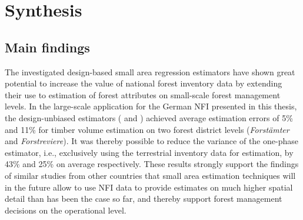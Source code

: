 	
\chapter{Synthesis}
\label{chap:synth}
\newpage



\section{Main findings}
\label{sec:synth:mainfind}


The investigated design-based small area regression estimators have shown great potential to increase the value of national forest inventory data by extending their use to estimation of forest attributes on small-scale forest management levels. In the large-scale application for the German NFI presented in this thesis, the design-unbiased estimators (\psmall{} and \extpsynth{}) achieved average estimation errors of 5\% and 11\% for timber volume estimation on two forest district levels (\textit{Forst{\"a}mter} and \textit{Forstreviere}). It was thereby possible to reduce the variance of the one-phase estimator, i.e., exclusively using the terrestrial inventory data for estimation, by 43\% and 25\% on average respectively. These results strongly support the findings of similar studies from other countries that small area estimation techniques will in the future allow to use NFI data to provide estimates on much higher spatial detail than has been the case so far, and thereby support forest management decisions on the operational level.\par
